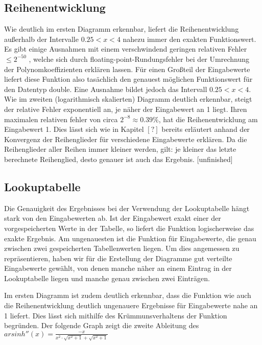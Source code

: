 \documentclass[course=erap] {aspdoc}
\begin{document}
    \subsection{Reihenentwicklung}
    Wie deutlich im ersten Diagramm erkennbar, liefert die Reihenentwicklung außerhalb der Intervalle $0.25<x<4$ nahezu immer den exakten Funktionswert. Es gibt einige Ausnahmen mit einem verschwindend geringen relativen Fehler $\leq2^{-50}$ , welche sich durch floating-point-Rundungsfehler bei der Umrechnung der Polynomkoeffizienten erklären lassen.
    Für einen Großteil der Eingabewerte liefert diese Funktion also tasächlich den genauest möglichen Funktionswert für den Datentyp double. Eine Ausnahme bildet jedoch das Intervall $0.25<x<4$. Wie im zweiten (logarithmisch skalierten) Diagramm deutlich erkennbar, steigt der relative Fehler exponentiell an, je näher der Eingabewert an 1 liegt. Ihren maximalen relativen fehler von circa $2^{-8} \approx 0.39\%$, hat die Reihenentwicklung am Eingabewert 1. Dies lässt sich wie in Kapitel $[?]$ bereits erläutert anhand der Konvergenz der Reihenglieder für verschiedene Eingabewerte erklären. Da die Reihenglieder aller Reihen immer kleiner werden, gilt: je kleiner das letzte berechnete Reihenglied, desto genauer ist auch das Ergebnis. [unfinished]
    
    \subsection{Lookuptabelle}
    Die Genauigkeit des Ergebnisses bei der Verwendung der Lookuptabelle hängt stark von den Eingabewerten ab. Ist der Eingabewert exakt einer der vorgespeicherten Werte in der Tabelle, so liefert die Funktion logischerweise das exakte Ergebnis. Am ungenauesten ist die Funktion für Eingabewerte, die genau zwischen zwei gespeicherten Tabellenwerten liegen. Um dies angemessen zu repräsentieren, haben wir für die Erstellung der Diagramme gut verteilte Eingabewerte gewählt, von denen manche näher an einem Eintrag in der Lookuptabelle liegen und manche genau zwischen zwei Einträgen.  
    
    Im ersten Diagramm ist zudem deutlich erkennbar, dass die Funktion wie auch die Reihenentwicklung deutlich ungenauere Ergebnisse für Eingabewerte nahe an 1 liefert. Dies lässt sich mithilfe des Krümmunsverhaltens der Funktion begründen. Der folgende Graph zeigt die zweite Ableitung des $arsinh''(x) = \frac{-x}{x^2\cdot \sqrt{x^2+1}+\sqrt{x^2+1}}$
\end{document}
